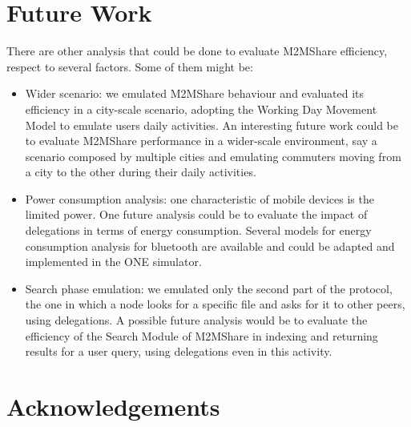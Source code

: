 \pagebreak
\section{Future Work}
There are other analysis that could be done to evaluate M2MShare efficiency, respect to several factors. Some of them might be:
\begin{itemize}
\item Wider scenario: we emulated M2MShare behaviour and evaluated its efficiency in a city-scale scenario, adopting the Working Day Movement Model to emulate users daily activities. An interesting future work could be to evaluate M2MShare performance in a wider-scale environment, say a scenario composed by multiple cities and emulating commuters moving from a city to the other during their daily activities.
\item Power consumption analysis: one characteristic of mobile devices is the limited power. One future analysis could be to evaluate the impact of delegations in terms of energy consumption. Several models for  energy consumption analysis for bluetooth are available and could be adapted and implemented in the ONE simulator.
\item Search phase emulation: we emulated only the second part of the protocol, the one in which a node looks for a specific file and asks for it to other peers, using delegations. A possible future analysis would be to evaluate the efficiency of the Search Module of M2MShare in indexing and returning results for a user query, using delegations even in this activity.
\end{itemize}

\section{Acknowledgements}
 

